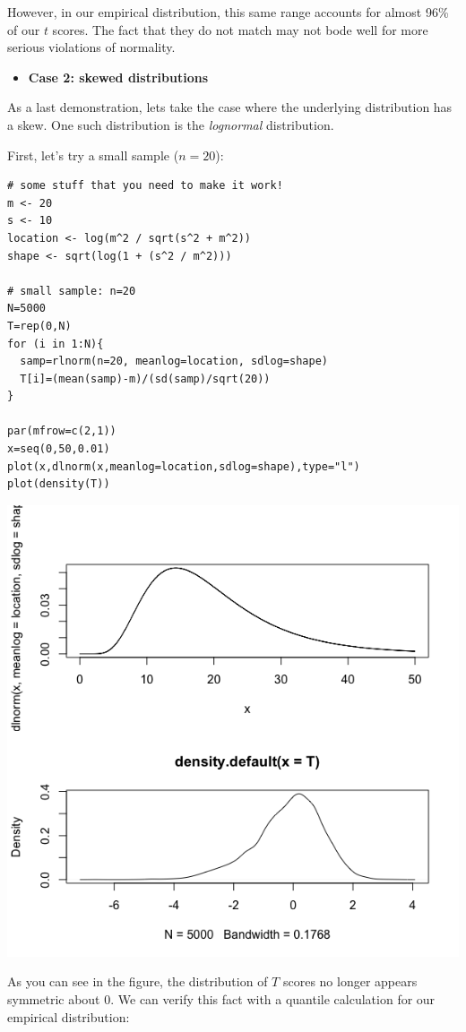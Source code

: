 \documentclass[11pt]{article}
\begin{document}
However, in our empirical distribution, this same range accounts for almost 96\% of our $t$ scores.  The fact that they do not match may not bode well for more serious violations of normality.

\begin{itemize}
\item \textbf{Case 2: skewed distributions}
\end{itemize}

As a last demonstration, lets take the case where the underlying distribution has a skew.  One such distribution is the \emph{lognormal} distribution.

First, let's try a small sample ($n=20$):

\begin{verbatim}
# some stuff that you need to make it work!
m <- 20
s <- 10
location <- log(m^2 / sqrt(s^2 + m^2))
shape <- sqrt(log(1 + (s^2 / m^2)))

# small sample: n=20
N=5000
T=rep(0,N)
for (i in 1:N){
  samp=rlnorm(n=20, meanlog=location, sdlog=shape)
  T[i]=(mean(samp)-m)/(sd(samp)/sqrt(20))
}

par(mfrow=c(2,1))
x=seq(0,50,0.01)
plot(x,dlnorm(x,meanlog=location,sdlog=shape),type="l")
plot(density(T))
\end{verbatim}

\includegraphics[width=.9\linewidth]{figures/week3/lognormal.png}

As you can see in the figure, the distribution of $T$ scores no longer appears symmetric about 0.  We can verify this fact with a quantile calculation for our empirical distribution:
\end{document}
